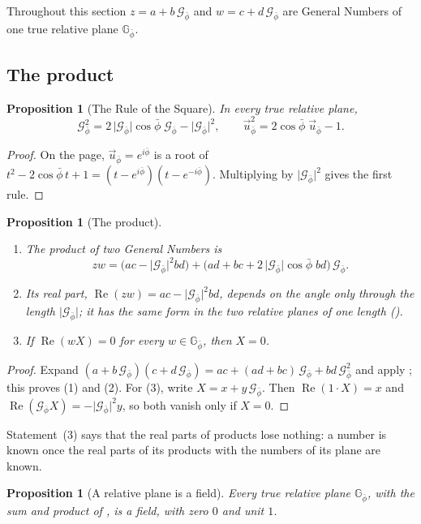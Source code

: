 \documentclass[11pt,a4paper]{amsart}
\theoremstyle{plain}
\newtheorem{proposition}[theorem]{Proposition}
\theoremstyle{definition}
\theoremstyle{remark}
\newcommand{\pb}{\bar{\phi}}                     %
\newcommand{\Gp}{\mathcal{G}_{\bar{\phi}}}       %
\newcommand{\up}{\vec{u}_{\bar{\phi}}}           %
\newcommand{\GNp}{\mathbb{G}_{\bar{\phi}}}       %
\renewcommand{\Re}{\operatorname{Re}}            %
\begin{document}
Throughout this section $z = a + b\,\Gp$ and $w = c + d\,\Gp$ are General Numbers of one true relative plane $\GNp$.

\subsection{The product}\label{subsec:product}

\begin{proposition}[The Rule of the Square]\label{prop:square-rule}
In every true relative plane,
\[
\Gp^2 = 2\,\lvert\Gp\rvert\cos\pb\;\Gp - \lvert\Gp\rvert^2 , \qquad \up^2 = 2\cos\pb\;\up - 1 .
\]
\end{proposition}

\begin{proof}
On the page, $\up = e^{i\pb}$ is a root of $t^2 - 2\cos\pb\,t + 1 = (t - e^{i\pb})(t - e^{-i\pb})$. Multiplying by $\lvert\Gp\rvert^2$ gives the first rule.
\end{proof}

\begin{proposition}[The product]\label{prop:product}
\begin{enumerate}
  \item The product of two General Numbers is
  \[
  zw = \bigl(ac - \lvert\Gp\rvert^2bd\bigr) + \bigl(ad + bc + 2\,\lvert\Gp\rvert\cos\pb\;bd\bigr)\,\Gp .
  \]
  \item Its real part, $\Re(zw) = ac - \lvert\Gp\rvert^2bd$, depends on the angle only through the length $\lvert\Gp\rvert$; it has the same form in the two relative planes of one length ().
  \item If $\Re(wX) = 0$ for every $w \in \GNp$, then $X = 0$.
\end{enumerate}
\end{proposition}

\begin{proof}
Expand $(a + b\,\Gp)(c + d\,\Gp) = ac + (ad + bc)\,\Gp + bd\,\Gp^2$ and apply ; this proves (1) and (2). For (3), write $X = x + y\,\Gp$. Then $\Re(1 \cdot X) = x$ and $\Re(\Gp X) = -\lvert\Gp\rvert^2y$, so both vanish only if $X = 0$.
\end{proof}

Statement~(3) says that the real parts of products lose nothing: a number is known once the real parts of its products with the numbers of its plane are known.

\begin{proposition}[A relative plane is a field]\label{thm:field}
Every true relative plane $\GNp$, with the sum and product of , is a field, with zero $0$ and unit $1$.
\end{proposition}
\end{document}
